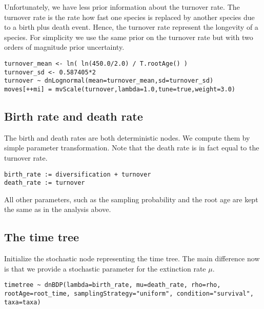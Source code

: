 Unfortunately, we have less prior information about the turnover rate.
The turnover rate is the rate how fast one species is replaced by another species due to a birth plus death event.
Hence, the turnover rate represent the longevity of a species.
For simplicity we use the same prior on the turnover rate but with two orders of magnitude prior uncertainty.
{\tt \begin{snugshade*}
\begin{lstlisting}
turnover_mean <- ln( ln(450.0/2.0) / T.rootAge() )
turnover_sd <- 0.587405*2
turnover ~ dnLognormal(mean=turnover_mean,sd=turnover_sd) 
moves[++mi] = mvScale(turnover,lambda=1.0,tune=true,weight=3.0)
\end{lstlisting}
\end{snugshade*}}

\subsection{Birth rate and death rate}

The birth and death rates are both deterministic nodes. 
We compute them by simple parameter transformation.
Note that the death rate is in fact equal to the turnover rate.
{\tt \begin{snugshade*}
\begin{lstlisting}
birth_rate := diversification + turnover
death_rate := turnover
\end{lstlisting}
\end{snugshade*}}

All other parameters, such as the sampling probability and the root age are kept the same as in the analysis above.

\subsection{The time tree}

Initialize the stochastic node representing the time tree.
The main difference now is that we provide a stochastic parameter for the extinction rate $\mu$.
{\tt \begin{snugshade*}
\begin{lstlisting}
timetree ~ dnBDP(lambda=birth_rate, mu=death_rate, rho=rho, rootAge=root_time, samplingStrategy="uniform", condition="survival", taxa=taxa)
\end{lstlisting}
\end{snugshade*}}




